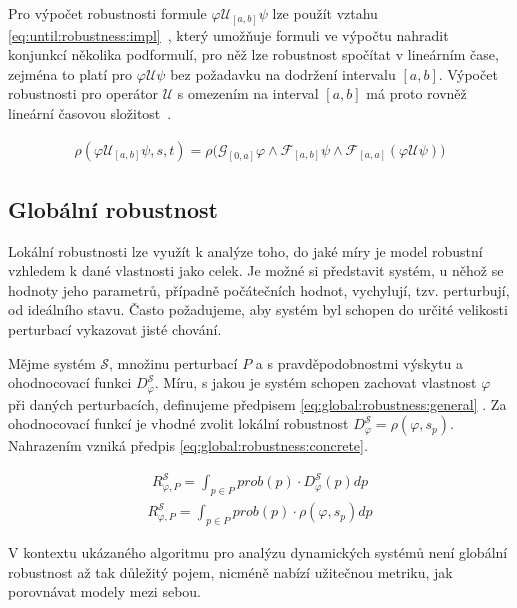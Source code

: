 Pro výpočet robustnosti formule $\varphi\mathcal{U}_{[a,b]}\psi$ lze použít vztahu \ref{eq:until:robustness:impl}~\cite{donze2010},
který umožňuje formuli ve výpočtu nahradit konjunkcí několika podformulí, pro něž lze robustnost spočítat v lineárním čase, zejména 
to platí pro $\varphi\mathcal{U}\psi$ bez požadavku na dodržení intervalu $[a,b]$. Výpočet robustnosti pro operátor $\mathcal{U}$
s omezením na interval $[a,b]$ má proto rovněž lineární časovou složitost~\cite{donze2010}.

\begin{align}\label{eq:until:robustness:impl}
\rho(\varphi\mathcal{U}_{[a,b]}\psi, s, t) = \rho\Big(\mathcal{G}_{[0, a]}\varphi \wedge \mathcal{F}_{[a,b]}\psi \wedge \mathcal{F}_{[a,a]}(\varphi\mathcal{U}\psi)\Big)
\end{align}

\subsection{Globální robustnost}

Lokální robustnosti lze využít k analýze toho, do jaké míry je model robustní vzhledem
k dané vlastnosti jako celek. Je možné si představit systém, u něhož se hodnoty jeho parametrů, případně počátečních
hodnot, vychylují, tzv. perturbují, od ideálního stavu. Často požadujeme, aby systém byl schopen do určité velikosti
perturbací vykazovat jisté chování.

Mějme systém $\mathcal{S}$, množinu perturbací $P$ a s pravděpodobnostmi výskytu a ohodnocovací funkci $D_\varphi^\mathcal{S}$.
Míru, s jakou je systém schopen zachovat vlastnost $\varphi$ při daných perturbacích,
definujeme předpisem \ref{eq:global:robustness:general} \cite{kitano2007}. Za ohodnocovací funkcí je vhodné zvolit lokální
robustnost $D_\varphi^\mathcal{S} = \rho(\varphi, s_p)$. Nahrazením vzniká předpis \ref{eq:global:robustness:concrete}.

\begin{align}
R_{\varphi, P}^\mathcal{S} = {\displaystyle\int_{p \in P}}prob(p) \cdot D_\varphi^\mathcal{S}(p)dp\label{eq:global:robustness:general}
\end{align}
\begin{align}
R_{\varphi, P}^\mathcal{S} = {\displaystyle\int_{p \in P}}prob(p) \cdot \rho(\varphi, s_p)dp\label{eq:global:robustness:concrete}
\end{align}

V kontextu ukázaného algoritmu pro analýzu dynamických systémů není globální robustnost až tak
důležitý pojem, nicméně nabízí užitečnou metriku, jak porovnávat modely mezi sebou.

